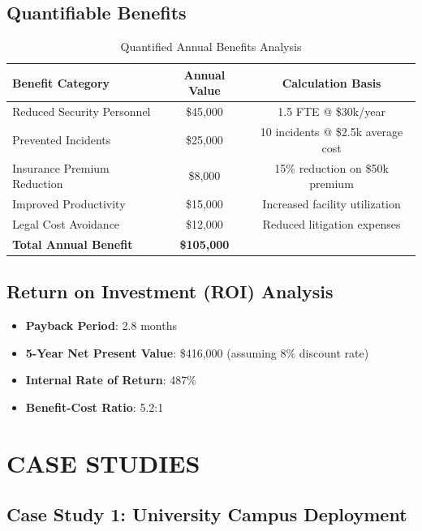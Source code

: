 \documentclass[12pt,a4paper]{article}
\begin{document}
\subsection{Quantifiable Benefits}

\begin{table}[h]
\centering
\begin{tabular}{|l|c|c|}
\hline
\textbf{Benefit Category} & \textbf{Annual Value} & \textbf{Calculation Basis} \\
\hline
Reduced Security Personnel & \$45,000 & 1.5 FTE @ \$30k/year \\
\hline
Prevented Incidents & \$25,000 & 10 incidents @ \$2.5k average cost \\
\hline
Insurance Premium Reduction & \$8,000 & 15\% reduction on \$50k premium \\
\hline
Improved Productivity & \$15,000 & Increased facility utilization \\
\hline
Legal Cost Avoidance & \$12,000 & Reduced litigation expenses \\
\hline
\textbf{Total Annual Benefit} & \textbf{\$105,000} & \\
\hline
\end{tabular}
\caption{Quantified Annual Benefits Analysis}
\end{table}

\subsection{Return on Investment (ROI) Analysis}

\begin{itemize}
    \item \textbf{Payback Period}: 2.8 months
    \item \textbf{5-Year Net Present Value}: \$416,000 (assuming 8\% discount rate)
    \item \textbf{Internal Rate of Return}: 487\%
    \item \textbf{Benefit-Cost Ratio}: 5.2:1
\end{itemize}

\newpage
\section{CASE STUDIES}

\subsection{Case Study 1: University Campus Deployment}
\end{document}
